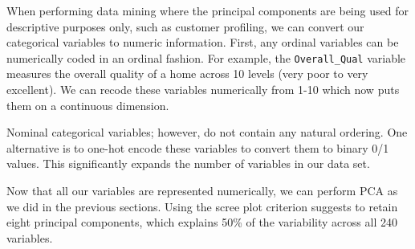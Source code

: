 \documentclass[]{book}
\newenvironment{Shaded}{\begin{snugshade}}{\end{snugshade}}
\newcommand{\CommentTok}[1]{\textcolor[rgb]{0.56,0.35,0.01}{\textit{#1}}}
\newcommand{\DataTypeTok}[1]{\textcolor[rgb]{0.13,0.29,0.53}{#1}}
\newcommand{\DecValTok}[1]{\textcolor[rgb]{0.00,0.00,0.81}{#1}}
\newcommand{\KeywordTok}[1]{\textcolor[rgb]{0.13,0.29,0.53}{\textbf{#1}}}
\newcommand{\NormalTok}[1]{#1}
\newcommand{\OperatorTok}[1]{\textcolor[rgb]{0.81,0.36,0.00}{\textbf{#1}}}
\newcommand{\OtherTok}[1]{\textcolor[rgb]{0.56,0.35,0.01}{#1}}
\newcommand{\StringTok}[1]{\textcolor[rgb]{0.31,0.60,0.02}{#1}}
\theoremstyle{definition}
\theoremstyle{definition}
\theoremstyle{definition}
\theoremstyle{remark}
\begin{document}
When performing data mining where the principal components are being
used for descriptive purposes only, such as customer profiling, we can
convert our categorical variables to numeric information. First, any
ordinal variables can be numerically coded in an ordinal fashion. For
example, the \texttt{Overall\_Qual} variable measures the overall
quality of a home across 10 levels (very poor to very excellent). We can
recode these variables numerically from 1-10 which now puts them on a
continuous dimension.

Nominal categorical variables; however, do not contain any natural
ordering. One alternative is to one-hot encode these variables to
convert them to binary 0/1 values. This significantly expands the number
of variables in our data set.

\begin{Shaded}
\end{Shaded}

Now that all our variables are represented numerically, we can perform
PCA as we did in the previous sections. Using the scree plot criterion
suggests to retain eight principal components, which explains 50\% of
the variability across all 240 variables.

\begin{Shaded}
\end{Shaded}
\end{document}
